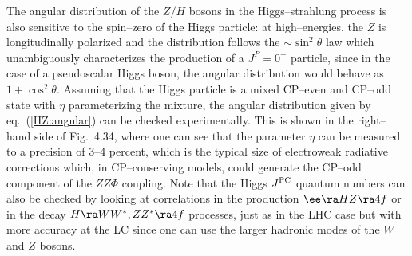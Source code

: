 The angular distribution of the $Z/H$ bosons in the Higgs--strahlung process is
also sensitive to the spin--zero of the Higgs particle: at high--energies, the
$Z$ is longitudinally polarized and the distribution follows the $\sim \sin^2
\theta$ law which unambiguously characterizes the production of a $J^P=0^+$
particle, since in the case of a pseudoscalar Higgs boson, the angular
distribution would behave as $1 +\cos^2\theta$. Assuming that the Higgs
particle is a mixed CP--even and CP--odd state with $\eta$ parameterizing the
mixture, the angular distribution given by eq.~(\ref{HZ:angular}) can be
checked experimentally. This is shown in the right--hand side of Fig.~4.34,
where one can see that the parameter $\eta$ can be measured to a precision of
3--4 percent, which is the typical size of electroweak radiative corrections
which, in CP--conserving models, could generate the CP--odd component of the
$ZZ\Phi$ coupling. Note that the Higgs $J^{\rm PC}$ quantum numbers can also be
checked by looking at correlations in the production $\ee \ra HZ \ra 4f$ or in
the decay $H \ra WW^*, ZZ^* \ra 4f$ processes, just as in the LHC case but with
more accuracy at the LC since one can use the larger hadronic modes of the $W$
and $Z$ bosons.\s

\begin{figure}[h!]
\begin{center}  
\begin{minipage}{7cm}
\end{minipage}
\hspace*{10mm}
\begin{minipage}{7cm}
\vspace*{-13.mm}
\end{minipage}
\end{center}
\vspace*{-3.mm}
\vspace*{-2.mm}
\end{figure}

